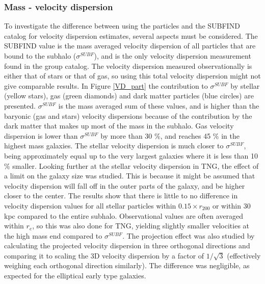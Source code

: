 \subsubsection{Mass - velocity dispersion}
To investigate the difference between using the particles and the SUBFIND catalog for velocity dispersion estimates, several aspects must be considered. The SUBFIND value is the mass averaged velocity dispersion of all particles that are bound to the subhalo ($\sigma^{SUBF}$), and is the only velocity dispersion measurement found in the group catalog. The velocity dispersion measured observationally is either that of stars or that of gas, so using this total velocity dispersion might not give comparable results. In Figure \ref{VD_part} the contribution to $\sigma^{SUBF}$ by stellar (yellow stars), gas (green diamonds) and dark matter particles (blue circles) are presented. 
$\sigma^{SUBF}$ is the mass averaged sum of these values, and is higher than the baryonic (gas and stars) velocity dispersions because of the contribution by the dark matter that makes up most of the mass in the subhalo. Gas velocity dispersion is lower than $\sigma^{SUBF}$ by more than 30 \%, and reaches 45 \% in the highest mass galaxies. The stellar velocity dispersion is much closer to $\sigma^{SUBF}$, being approximately equal up to the very largest galaxies where it is less than 10 \% smaller. Looking further at the stellar velocity dispersion in TNG, the effect of a limit on the galaxy size was studied. This is because it might be assumed that velocity dispersion will fall off in the outer parts of the galaxy, and be higher closer to the center. The results show that there is little to no difference in velocity dispersion values for all stellar particles within $0.15 \times r_{200}$ or within 30 kpc compared to the entire subhalo. Observational values are often averaged within $r_e$, so this was also done for TNG, yielding slightly smaller velocities at the high mass end compared to $\sigma^{SUBF}$. The projection effect was also studied by calculating the projected velocity dispersion in three orthogonal directions and comparing it to scaling the 3D velocity dispersion by a factor of $1/\sqrt{3}$ (effectively weighing each orthogonal direction similarly). The difference was negligible, as expected for the elliptical early type galaxies.


